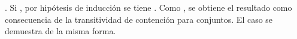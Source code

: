 \begin{isabellebody}
\begin{isamarkuptext}
\begin{demostracion}
    . Si , por hipótesis de inducción se tiene 
    . Como , se 
    obtiene el resultado como consecuencia de la transitividad de contención para conjuntos. El 
    caso  se demuestra de la misma forma.      
  \end{demostracion}


\end{isamarkuptext}
\end{isabellebody}
